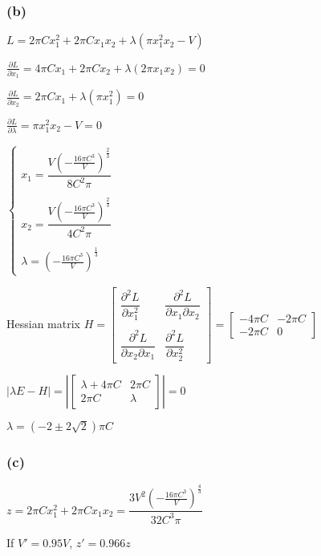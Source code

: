 \documentclass{article}
\begin{document}
\subsubsection*{(b)}
$L=2\pi Cx_{1}^{2}+2\pi Cx_{1}x_{2}+\lambda(\pi x_{1}^{2}x_{2}-V)$\par
$\frac{\partial L}{\partial x_{1}}=4\pi Cx_{1}+2\pi Cx_{2}+\lambda(2\pi x_{1}x_{2})=0$\par
$\frac{\partial L}{\partial x_{2}}=2\pi Cx_{1}+\lambda(\pi x_{1}^{2})=0$\par
$\frac{\partial L}{\partial \lambda}=\pi x_{1}^{2}x_{2}-V=0$\par\indent
\par
$\begin{cases}
x_{1}= \dfrac{V(-\frac{16\pi C^{3}}{V})^{\frac{2}{3}}}{8C^{2}\pi}\\
\\
x_{2}= \dfrac{V(-\frac{16\pi C^{3}}{V})^{\frac{2}{3}}}{4C^{2}\pi}\\
\\
\lambda= (-\frac{16\pi C^{3}}{V})^{\frac{1}{3}}
\end{cases}$\par\indent
\par
Hessian matrix $H=\begin{bmatrix}
\dfrac{\partial ^{2}L}{\partial x_{1}^{2}} & \dfrac{\partial ^{2}L}{\partial x_{1}\partial x_{2}} \\
\\
\dfrac{\partial ^{2}L}{\partial x_{2}\partial x_{1}} & \dfrac{\partial ^{2}L}{\partial x_{2}^{2}}
\end{bmatrix}=\begin{bmatrix}
-4\pi C & -2\pi C \\
-2\pi C & 0
\end{bmatrix}$\par\indent
\par\indent
\par
$|\lambda E-H|=|\begin{bmatrix}
\lambda+4\pi C & 2\pi C \\
2\pi C & \lambda
\end{bmatrix}|=0$\par\indent
\par\indent
\par
$\lambda=(-2\pm 2\sqrt{2})\pi C$

\subsubsection*{(c)}
$z=2\pi Cx_{1}^{2}+2\pi Cx_{1}x_{2}=\dfrac{3V^{2}(-\frac{16\pi C^{3}}{V})^{\frac{4}{3}}}{32C^{3}\pi}$\par\indent
\par
If $V'=0.95V$, $z'=0.966z$
\end{document}
